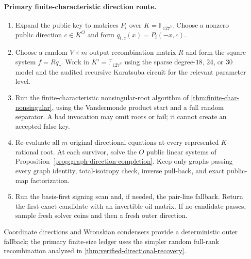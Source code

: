 \documentclass[11pt,a4paper]{article}
\theoremstyle{definition}
\theoremstyle{remark}
\newcommand{\F}{\mathbb F}
\begin{document}
\paragraph{Primary finite-characteristic direction route.}
\begin{enumerate}
\item Expand the public key to matrices $P_i$ over $K=\F_{127^3}$.  Choose a nonzero public direction $c\in K^O$ and form $q_{i,c}(x)=P_i(-x,c)$.
\item Choose a random $V\times m$ output-recombination matrix $R$ and form the square system $f=Rq_c$.  Work in $K'=\F_{127^d}$ using the sparse degree-$18$, $24$, or $30$ model and the audited recursive Karatsuba circuit for the relevant parameter level.
\item Run the finite-characteristic nonsingular-root algorithm of \cref{thm:finite-char-nonsingular}, using the Vandermonde product start and a full random separator.  A bad invocation may omit roots or fail; it cannot create an accepted false key.
\item Re-evaluate all $m$ original directional equations at every represented $K$-rational root.  At each survivor, solve the $O$ public linear systems of Proposition~\ref{prop:graph-direction-completion}.  Keep only graphs passing every graph identity, total-isotropy check, inverse pull-back, and exact public-map factorization.
\item Run the basis-first signing scan and, if needed, the pair-line fallback.  Return the first exact candidate with an invertible oil matrix.  If no candidate passes, sample fresh solver coins and then a fresh outer direction.
\end{enumerate}
Coordinate directions and Wronskian condensers provide a deterministic outer fallback; the primary finite-size ledger uses the simpler random full-rank recombination analyzed in \cref{thm:verified-directional-recovery}.
\end{document}
